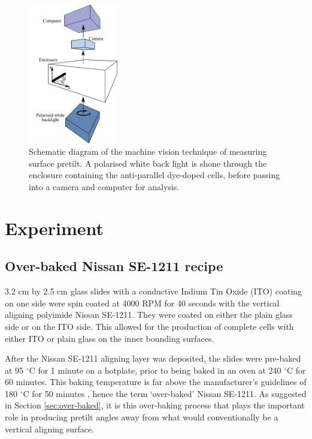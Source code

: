 \begin{figure}
\begin{center}
\includegraphics[width=0.35\textwidth]{Figures/Pretilt/camera_kit}
\end{center}
\caption[Schematic diagram of machine vision setup]{\label{fig:camerakit}Schematic diagram of the machine vision technique of measuring surface pretilt. A polarised white back light is shone through the enclosure containing the anti-parallel dye-doped cells, before passing into a camera and computer for analysis.}
\end{figure}
\section{Experiment}

\subsection{Over-baked Nissan SE-1211 recipe}
\label{sec:1211recipe}
3.2 cm by 2.5 cm glass slides with a conductive Indium Tin Oxide (ITO) coating on one side were spin coated at 4000 RPM for 40 seconds with the vertical aligning polyimide Nissan SE-1211. They were coated on either the plain glass side or on the ITO side. This allowed for the production of complete cells with either ITO or plain glass on the inner bounding surfaces.

After the Nissan SE-1211 aligning layer was deposited, the slides were pre-baked at 95 $^\circ$C for 1 minute on a hotplate, prior to being baked in an oven at 240 $^\circ$C for 60 minutes. This baking temperature is far above the manufacturer's guidelines of 180 $^\circ$C for 50 minutes \cite{Wang2007}, hence the term `over-baked' Nissan SE-1211. As suggested in Section \ref{sec:over-baked}, it is this over-baking process that plays the important role in producing pretilt angles away from what would conventionally be a vertical aligning surface. 

